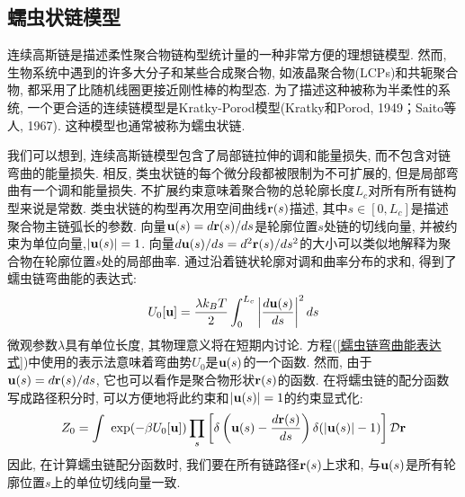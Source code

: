 \subsection{蠕虫状链模型}

\qquad 连续高斯链是描述柔性聚合物链构型统计量的一种非常方便的理想链模型. 然而, 生物系统中遇到的许多大分子和某些合成聚合物, 如液晶聚合物(LCPs)和共轭聚合物, 都采用了比随机线圈更接近刚性棒的构型态. 为了描述这种被称为半柔性的系统, 一个更合适的连续链模型是Kratky-Porod模型(Kratky和Porod, 1949；Saito等人, 1967). 这种模型也通常被称为蠕虫状链. 

我们可以想到, 连续高斯链模型包含了局部链拉伸的调和能量损失, 而不包含对链弯曲的能量损失. 相反, 类虫状链的每个微分段都被限制为不可扩展的, 但是局部弯曲有一个调和能量损失. 不扩展约束意味着聚合物的总轮廓长度$L_c$对所有所有链构型来说是常数. 类虫状链的构型再次用空间曲线$\mathbf{r}(s)$描述, 其中$s\in [0,L_c]$是描述聚合物主链弧长的参数. 向量$\mathbf{u}(s)=d\mathbf{r}(s)/ds$是轮廓位置$s$处链的切线向量, 并被约束为单位向量,$|\mathbf{u}(s)| =1$. 向量$d\mathbf{u}(s)/ds=d^2\mathbf{r}(s)/ds^2$的大小可以类似地解释为聚合物在轮廓位置$s$处的局部曲率. 通过沿着链状轮廓对调和曲率分布的求和, 得到了蠕虫链弯曲能的表达式:\\
\begin{equation}
	U_0[\mathbf{u}]=\frac{\lambda k_B T}{2}\int_{0}^{L_c}\left|\frac{d\mathbf{u}(s)}{ds}\right|^2 ds \label{蠕虫链弯曲能表达式}
\end{equation}
微观参数$\lambda$具有单位长度, 其物理意义将在短期内讨论. 方程(\ref{蠕虫链弯曲能表达式})中使用的表示法意味着弯曲势$U_0$是$\mathbf{u}(s)$的一个函数. 然而, 由于$\mathbf{u}(s)=d\mathbf{r}(s)/ds$, 它也可以看作是聚合物形状$\mathbf{r}(s)$的函数. 在将蠕虫链的配分函数写成路径积分时, 可以方便地将此约束和$|\mathbf{u}(s)|=1$的约束显式化:\\
\begin{equation}
	Z_0=\int\ \exp (-\beta U_0[\mathbf{u}])\prod_s\left[\delta\left(\mathbf{u}(s)-\frac{d\mathbf{r}(s)}{ds}\right)\delta(|\mathbf{u}(s)|-1)\right] \mathcal{D} \mathbf{r}\label{蠕虫链的配分函数加约束}
\end{equation}
因此, 在计算蠕虫链配分函数时, 我们要在所有链路径$\mathbf{r}(s)$上求和, 与$\mathbf{u}(s)$是所有轮廓位置$s$上的单位切线向量一致. \\

